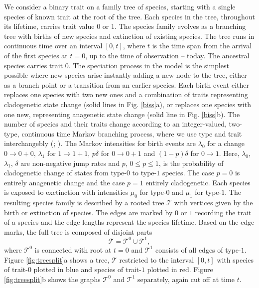 \documentclass[a4paper,11pt]{article}
\theoremstyle{plain}
\theoremstyle{definition}
\numberwithin{equation}{section}
\begin{document}
We consider a binary trait on a family tree of species, starting with
a single species of known trait at the root of the tree.  Each species
in the tree, throughout its lifetime, carries trait value $0$ or $1$.
The species family evolves as a branching tree with births of new
species and extinction of existing species.  The tree runs in
continuous time over an interval $[0,t]$, where $t$ is the time span
from the arrival of the first species at $t=0$, up to the time of
observation -- today.  The ancestral species carries trait $0$.  The
speciation process in the model is the simplest possible where new
species arise instantly adding a new node to the tree, either as a
branch point or a transition from an earlier species.  Each birth
event either replaces one species with two new ones and a combination
of traits representing cladogenetic state change (solid lines in
Fig. \ref{biss}a), or replaces one species with one new, representing
anagenetic state change (solid line in Fig. \ref{biss}b).  The number
of species and their traits change according to an integer-valued,
two-type, continuous time Markov branching process, where we use type
and trait interchangebly (\cite{athreya_ney};
\cite{taylor_karlin}).  The Markov intensities for birth events are
$\lambda_0$ for a change $0\to 0+0$, $\lambda_1$ for $1\to 1+1$,
$p\delta$ for $0\to 0+1$ and $(1-p)\delta$ for $0\to 1$. Here,
$\lambda_0$, $\lambda_1$, $\delta$ are non-negative jump rates and $p$, $0\le p\le 1$,
is the probability of
cladogenetic change of states from type-$0$ to type-$1$ species.
 The case $p=0$ is entirely anagenetic
change and the case $p=1$ entirely cladogenetic.  Each species is
exposed to exctinction with intensities $\mu_0$ for type-$0$ and
$\mu_1$ for type-$1$.  The resulting species family is described by a
rooted tree $\mathcal T$ with vertices given by the birth or
extinction of species. The edges are marked by $0$ or $1$ recording
the trait of a species and the edge lengths represent the species
lifetime.  Based on the edge marks, the full tree is composed of
disjoint parts
\[
\mathcal T=\mathcal T^0\cup \mathcal T^1,
\]
where $\mathcal T^\mathrm{0}$ is connected with root at $t=0$ and
$\mathcal T^\mathrm{1}$ consists of all edges of type-$1$.  
Figure \ref{fig:treesplit}a shows a tree, $\mathcal T$ restricted to the
interval $[0,t]$ with species of trait-$0$ plotted in blue and species
of trait-$1$ plotted in red. Figure \ref{fig:treesplit}b
shows the graphs $\mathcal T^0$ and $\mathcal T^1$ separately, again cut off at time
$t$. 
\end{document}

